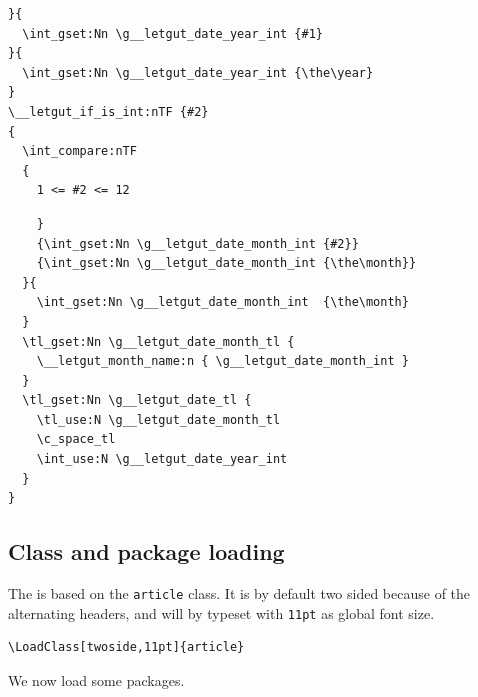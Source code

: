 \documentclass{letgut}
\begin{document}
\begin{lstlisting}
}{
  \int_gset:Nn \g__letgut_date_year_int {#1}
}{
  \int_gset:Nn \g__letgut_date_year_int {\the\year}
}
\__letgut_if_is_int:nTF {#2}
{
  \int_compare:nTF
  {
    1 <= #2 <= 12
\end{lstlisting}

\begin{lstlisting}
    }
    {\int_gset:Nn \g__letgut_date_month_int {#2}}
    {\int_gset:Nn \g__letgut_date_month_int {\the\month}}
  }{
    \int_gset:Nn \g__letgut_date_month_int  {\the\month}
  }
  \tl_gset:Nn \g__letgut_date_month_tl {
    \__letgut_month_name:n { \g__letgut_date_month_int }
  }
  \tl_gset:Nn \g__letgut_date_tl {
    \tl_use:N \g__letgut_date_month_tl
    \c_space_tl
    \int_use:N \g__letgut_date_year_int
  }
}
\end{lstlisting}
\subsection{Class and package loading}
\label{ImplementationClassandpackageloading-aqfg55h0jlj0}
The  is based on the \lstinline+article+ class. It is by default two sided
because of the alternating headers, and will by typeset with \lstinline+11pt+ as global
font size.

\begin{lstlisting}
\LoadClass[twoside,11pt]{article}
\end{lstlisting}

We now load some packages.
\end{document}
